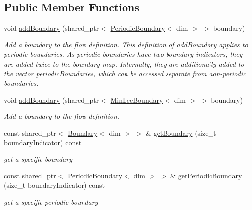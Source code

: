 \subsection*{Public Member Functions}
\begin{DoxyCompactItemize}
\item 
void \hyperlink{classnatrium_1_1BoundaryCollection_a60d5efd5fa9bf2107705ee1a38508dd4}{addBoundary} (shared\_\-ptr$<$ \hyperlink{classnatrium_1_1PeriodicBoundary}{PeriodicBoundary}$<$ dim $>$ $>$ boundary)
\begin{DoxyCompactList}\small\item\em Add a boundary to the flow definition. This definition of addBoundary applies to periodic boundaries. As periodic boundaries have two boundary indicators, they are added twice to the boundary map. Internally, they are additionally added to the vector periodicBoundaries, which can be accessed separate from non-\/periodic boundaries. \item\end{DoxyCompactList}\item 
void \hyperlink{classnatrium_1_1BoundaryCollection_ac8ad257c880937c59baad2d646392d7d}{addBoundary} (shared\_\-ptr$<$ \hyperlink{classnatrium_1_1MinLeeBoundary}{MinLeeBoundary}$<$ dim $>$ $>$ boundary)
\begin{DoxyCompactList}\small\item\em Add a boundary to the flow definition. \item\end{DoxyCompactList}\item 
const shared\_\-ptr$<$ \hyperlink{classnatrium_1_1Boundary}{Boundary}$<$ dim $>$ $>$ \& \hyperlink{classnatrium_1_1BoundaryCollection_adacc8205b74bdc7344161e73f1acadca}{getBoundary} (size\_\-t boundaryIndicator) const 
\begin{DoxyCompactList}\small\item\em get a specific boundary \item\end{DoxyCompactList}\item 
const shared\_\-ptr$<$ \hyperlink{classnatrium_1_1PeriodicBoundary}{PeriodicBoundary}$<$ dim $>$ $>$ \& \hyperlink{classnatrium_1_1BoundaryCollection_ac3a84114a57f0e321a24eaa743a141f3}{getPeriodicBoundary} (size\_\-t boundaryIndicator) const 
\begin{DoxyCompactList}\small\item\em get a specific periodic boundary \item\end{DoxyCompactList}\item 

\end{DoxyCompactItemize}
